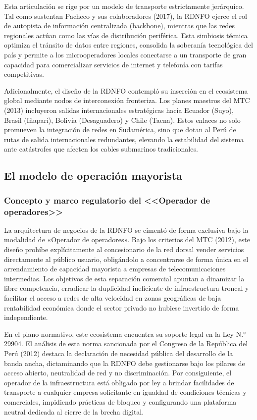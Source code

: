 Esta articulación se rige por un modelo de transporte estrictamente jerárquico. Tal como sustentan Pacheco y sus colaboradores (2017), la RDNFO ejerce el rol de autopista de información centralizada (backbone), mientras que las redes regionales actúan como las vías de distribución periférica. Esta simbiosis técnica optimiza el tránsito de datos entre regiones, consolida la soberanía tecnológica del país y permite a los microoperadores locales conectarse a un transporte de gran capacidad para comercializar servicios de internet y telefonía con tarifas competitivas.

Adicionalmente, el diseño de la RDNFO contempló su inserción en el ecosistema global mediante nodos de interconexión fronteriza. Los planes maestros del MTC (2013) incluyeron salidas internacionales estratégicas hacia Ecuador (Suyo), Brasil (Iñapari), Bolivia (Desaguadero) y Chile (Tacna). Estos enlaces no solo promueven la integración de redes en Sudamérica, sino que dotan al Perú de rutas de salida internacionales redundantes, elevando la estabilidad del sistema ante catástrofes que afecten los cables submarinos tradicionales.
\subsection{El modelo de operación mayorista}
\subsubsection{Concepto y marco regulatorio del <<Operador de operadores>>}
La arquitectura de negocios de la RDNFO se cimentó de forma exclusiva bajo la modalidad de «Operador de operadores». Bajo los criterios del MTC (2012), este diseño prohíbe explícitamente al concesionario de la red dorsal vender servicios directamente al público usuario, obligándolo a concentrarse de forma única en el arrendamiento de capacidad mayorista a empresas de telecomunicaciones intermedias. Los objetivos de esta separación comercial apuntan a dinamizar la libre competencia, erradicar la duplicidad ineficiente de infraestructura troncal y facilitar el acceso a redes de alta velocidad en zonas geográficas de baja rentabilidad económica donde el sector privado no hubiese invertido de forma independiente.

En el plano normativo, este ecosistema encuentra su soporte legal en la Ley N.° 29904. El análisis de esta norma sancionada por el Congreso de la República del Perú (2012) destaca la declaración de necesidad pública del desarrollo de la banda ancha, dictaminando que la RDNFO debe gestionarse bajo los pilares de acceso abierto, neutralidad de red y no discriminación. Por consiguiente, el operador de la infraestructura está obligado por ley a brindar facilidades de transporte a cualquier empresa solicitante en igualdad de condiciones técnicas y comerciales, impidiendo prácticas de bloqueo y configurando una plataforma neutral dedicada al cierre de la brecha digital.

